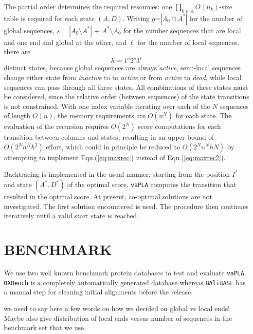 \documentclass[a4paper,10pt]{article}
\let\cite\citep
\newcommand{\TODO}[1]{\begingroup\color{red}#1\endgroup}
\newcommand{\SAFTWARE}{\texttt{vaPLA}} %
\begin{document}
The partial order determines the required resources: one
$\prod_{k\in A} O(n_k)$-size table is required for each state $(A,D)$.
Writing $g$=$|A_0\cap A^*|$ for the number of global sequences,
$s=|A_0\setminus A^*|$ + $A^*\setminus A_0$ for the number sequences that
are local and one end and global at the other, and $\ell$ for the number of
local sequences, there are
\begin{equation}
  h = 1^a 2^s 3^{\ell} 
\end{equation} 
distinct states, because global sequences are always \textit{active},
semi-local sequences change either state from \textit{inactive} to to
\textit{active} or from \textit{active} to \textit{dead}, while local
sequences can pass through all three states. All combinations of these
states must be considered, since the relative order (between sequences) of
the state transitions is not constrained. With one index variable
  iterating over each of the $N$ sequences of length $O(n)$, the memory
  requirements are $O(n^N)$ for each state.  The evaluation of the
  recursion requires $O(2^N)$ score computations for each transition
  between columns and states, resulting in an upper bound of
  $O(2^N n^N h^2)$ effort, which could in principle be reduced to
  $O(2^N n^N h N)$ by attempting to implement Equ.(\ref{eq:maxrec})
  instead of Equ.(\ref{eq:maxrec2}).

Backtracing is implemented in the usual manner: starting from the
  position $I^*$ and state $(A^*,D^*)$ of the optimal score, \SAFTWARE{}
  computes the transition that resulted in the optimal score. At present,
  co-optimal solutions are not investigated. The first solution encountered
  is used. The procedure then continues iteratively until a valid start state
  is reached.

\section{\uppercase{Benchmark}}

We use two well known benchmark protein databases to test and evaluate
\SAFTWARE. \texttt{OXBench} \cite{oxbench} is a completely automatically
generated database whereas \texttt{BAliBASE} \cite{balibase} has a manual
step for cleaning initial alignments before the release.

\TODO{we need to say here a few words on how we decided on global vs local
  ends! Maybe also give distribution of local ends versus number of
  sequences in the benchmark set that we use.}
\end{document}
